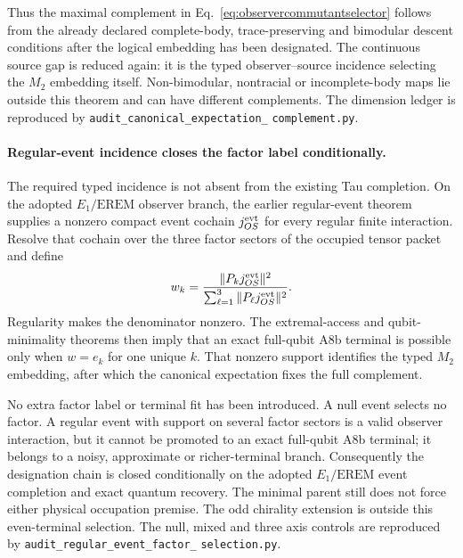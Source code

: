Thus the maximal complement in
Eq.~\eqref{eq:observercommutantselector} follows
from the already declared complete-body, trace-preserving and bimodular
descent conditions after the logical embedding has been designated. The
continuous source gap is reduced again: it is the typed observer--source
incidence selecting the $M_2$ embedding itself. Non-bimodular, nontracial or
incomplete-body maps lie outside this theorem and can have different
complements. The dimension ledger is reproduced by
\texttt{audit\_canonical\_expectation\_}\allowbreak
\texttt{complement.py}.

\paragraph{Regular-event incidence closes the factor label conditionally.}
The required typed incidence is not absent from the existing Tau completion.
On the adopted $E_1/\mathrm{EREM}$ observer branch, the earlier regular-event
theorem supplies a nonzero compact event cochain $j_{OS}^{\rm evt}$ for every
regular finite interaction. Resolve that cochain over the three factor
sectors of the occupied tensor packet and define
\begin{equation}
 w_k=
 \frac{\|P_kj_{OS}^{\rm evt}\|^2}
 {\sum_{\ell=1}^{3}\|P_\ell j_{OS}^{\rm evt}\|^2}.
 \label{eq:eventfactorweights}
\end{equation}
Regularity makes the denominator nonzero. The extremal-access and
qubit-minimality theorems then imply that an exact full-qubit A8b terminal is
possible only when $w=e_k$ for one unique $k$. That nonzero support identifies
the typed $M_2$ embedding, after which the canonical expectation fixes the
full complement.

No extra factor label or terminal fit has been introduced. A null event
selects no factor. A regular event with support on several factor sectors is
a valid observer interaction, but it cannot be promoted to an exact
full-qubit A8b terminal; it belongs to a noisy, approximate or richer-terminal
branch. Consequently the designation chain is closed conditionally on the
adopted $E_1/\mathrm{EREM}$ event completion and exact quantum recovery. The
minimal parent still does not force either physical occupation premise. The
odd chirality extension is outside this even-terminal selection. The null,
mixed and three axis controls are
reproduced by
\texttt{audit\_regular\_event\_factor\_}\allowbreak
\texttt{selection.py}.

